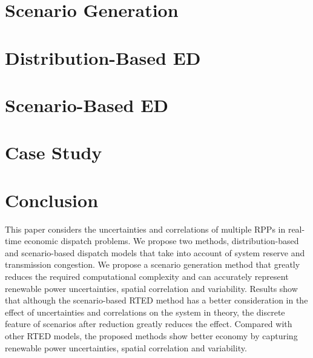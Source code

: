 \section{Scenario Generation}


\section{Distribution-Based ED} \label{sec:dist}




\section{Scenario-Based ED}





\section{Case Study}




\section{Conclusion}

This paper considers the uncertainties and correlations of multiple RPPs in real-time economic dispatch problems. We propose two methods, distribution-based and scenario-based dispatch models that take into account of system reserve and transmission congestion. We propose a scenario generation method that greatly reduces the required computational complexity and can accurately represent renewable power uncertainties, spatial correlation and variability. Results show that although the scenario-based RTED method has a better consideration in the effect of uncertainties and correlations on the system in theory, the discrete feature of scenarios after reduction greatly reduces the effect. Compared with other RTED models, the proposed methods show better economy by capturing renewable power uncertainties, spatial correlation and variability.
%



